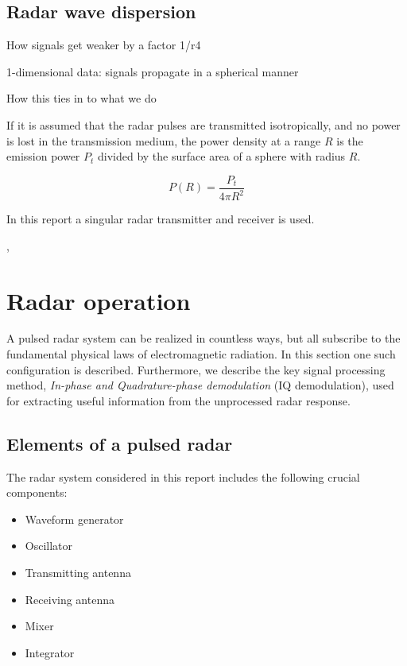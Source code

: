 \subsection{Radar wave dispersion}

How signals get weaker by a factor 1/r4

1-dimensional data: signals propagate in a spherical manner

How this ties in to what we do


If it is assumed that the radar pulses are transmitted isotropically, and no power is lost in the transmission medium, the power density at a range $R$ is the emission power $P_t$ divided by the surface area of a sphere with radius $R$.

\begin{equation}
	P(R) = \frac{P_t}{4\pi R^2}
\end{equation}


In this report a singular radar transmitter and receiver is used. 



\citep{skolnik_2009}, \citep{richards_2014}


\section{Radar operation}

A pulsed radar system can be realized in countless ways, but all subscribe to the fundamental physical laws of electromagnetic radiation. In this section one such configuration is described. Furthermore, we describe the key signal processing method, \emph{In-phase and Quadrature-phase demodulation} (IQ demodulation), used for extracting useful information from the unprocessed radar response. 

\subsection{Elements of a pulsed radar}
The radar system considered in this report includes the following crucial components:

\begin{itemize}
	\item Waveform generator
	\item Oscillator
	\item Transmitting antenna
	\item Receiving antenna
	\item Mixer
	\item Integrator
\end{itemize}

